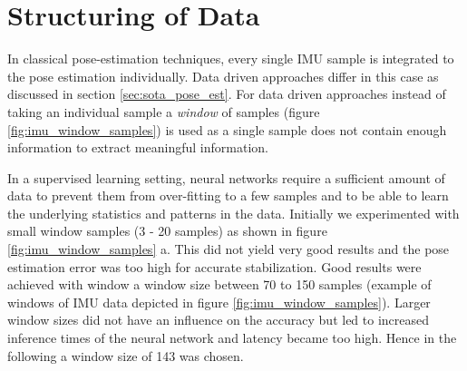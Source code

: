 \section{Structuring of Data}
\label{sec:data_structure}
In classical pose-estimation techniques, every single IMU sample is integrated to the pose estimation individually. Data driven approaches differ in this case as discussed in section \ref{sec:sota_pose_est}. For data driven approaches instead of taking an individual sample a \textit{window} of samples (figure \ref{fig:imu_window_samples}) is used as a single sample does not contain enough information to extract meaningful information. 

In a supervised learning setting, neural networks require a sufficient amount of data to prevent them from over-fitting to a few samples and to be able to learn the underlying statistics and patterns in the data. Initially we experimented with small window samples (3 - 20 samples) as shown in figure \ref{fig:imu_window_samples} a. This did not yield very good results and the pose estimation error was too high for accurate stabilization. Good results were achieved with window a window size between 70 to 150 samples (example of windows of IMU data depicted in figure \ref{fig:imu_window_samples}). Larger window sizes did not have an influence on the accuracy but led to increased inference times of the neural network and latency became too high. Hence in the following a window size of 143 was chosen.

